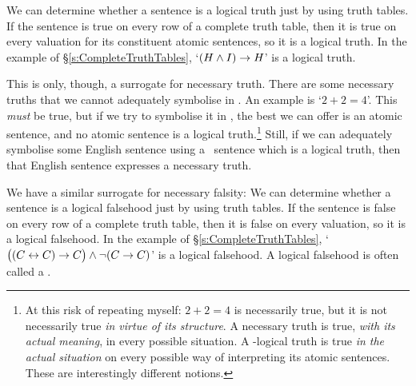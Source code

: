 We can determine whether a sentence is a logical truth just by using truth tables. If the sentence is true on every row of a complete truth table, then it is true on every valuation for its constituent atomic sentences, so it is a logical truth. In the example of §\ref{s:CompleteTruthTables}, `$(H \wedge I) \rightarrow H$' is a logical truth. 


This is only, though, a surrogate for necessary truth. There are some necessary truths that we cannot adequately symbolise in \TFL. An example is `$2 + 2 = 4$'. This \emph{must} be true, but if we try to symbolise it in \TFL, the best we can offer is an atomic sentence, and no atomic sentence is a logical truth.\footnote{At this risk of repeating myself: $2+2=4$ is necessarily true, but it is not necessarily true \emph{in virtue of its structure}. A necessary truth is true, \emph{with its actual meaning}, in every possible situation. A \TFL-logical truth is true \emph{in the actual situation} on every possible way of interpreting its atomic sentences. These are interestingly different notions.} Still, if we can adequately symbolise some English sentence using a \TFL\ sentence which is a logical truth, then that English sentence expresses a necessary truth.

We have a similar surrogate for necessary falsity:
We can determine whether a sentence is a logical falsehood just by using truth tables. If the sentence is false on every row of a complete truth table, then it is false on every valuation, so it is a logical falsehood. In the example of §\ref{s:CompleteTruthTables}, `$\bigl( (C\leftrightarrow C) \rightarrow C\bigr)  \wedge \neg(C \rightarrow C)$' is a logical falsehood. A logical falsehood is often called a .


